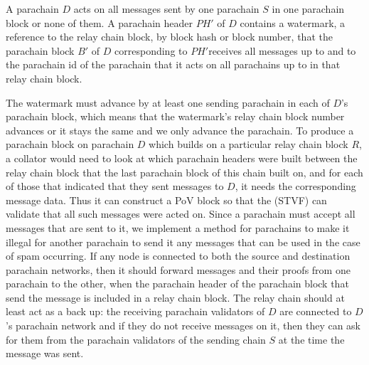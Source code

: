 A parachain $D$ acts on all messages sent by one parachain $S$ in one parachain block or none of them. A parachain header $PH'$ of $D$ contains a watermark, a reference to the relay chain block, by block hash or block number, that the parachain block $B'$ of $D$ corresponding to $PH'$receives all messages up to and to the parachain id of the parachain that it acts on all parachains up to in that relay chain block.

The watermark must advance by at least one sending parachain in each of $D$'s parachain block, which means that the watermark's relay chain block number advances or it stays the same and we only advance the parachain. To produce a parachain block on parachain $D$ which builds on a particular relay chain block $R$, a collator would need to look at which parachain headers were built between the relay chain block that the last parachain block of this chain built on,
and for each of those that indicated that they sent messages to $D$, it needs the corresponding message data.
Thus it can construct a PoV block so that the (STVF) can validate that all such messages were acted on. Since a parachain must accept all messages that are sent to it,
we implement a method for parachains to make it illegal for another parachain to send it any messages that can be used in the case of spam occurring. If any node is connected to both the source and destination parachain networks, then it should forward messages and their proofs from one parachain to the other,
when the parachain header of the parachain block that send the message is included in a relay chain block. The relay chain should at least act as a back up: the receiving parachain validators  of $D$ are connected to $D$'s parachain network and if they do not receive messages on it, then they can ask for them from the parachain validators of the sending chain $S$ at the time the message was sent.

